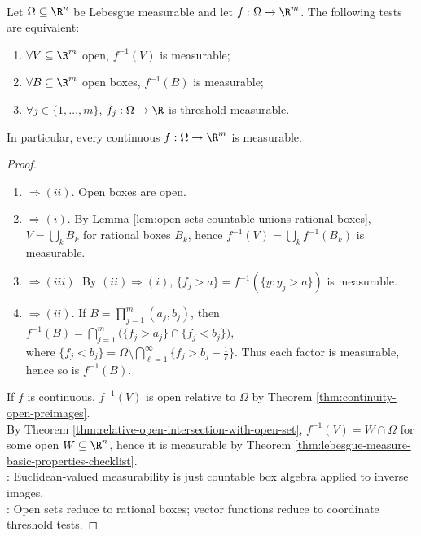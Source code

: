 \begin{proposition} \label{prop:measurable-function-open-set-test} \\
Let $\Omega\subseteq\R^n$ be Lebesgue measurable and let $f:\Omega\to\R^m$. The following tests are equivalent:
\begin{enumerate}[label=(\roman*)]
\setlength{\itemsep}{0pt}
\item $\forall V\subseteq\R^m$ open, $f^{-1}(V)$ is measurable;
\item $\forall B\subseteq\R^m$ open boxes, $f^{-1}(B)$ is measurable;
\item $\forall j\in\{1,\ldots,m\}$, $f_j:\Omega\to\R$ is threshold-measurable.
\end{enumerate}
In particular, every continuous $f:\Omega\to\R^m$ is measurable.
\begin{proof}
\begin{enumerate}[label=(\roman*).]
\setlength{\itemsep}{0pt}
\item[$(i)$]$\Rightarrow (ii)$. Open boxes are open.
\item[$(ii)$]$\Rightarrow (i)$. By Lemma \ref{lem:open-sets-countable-unions-rational-boxes}, $V=\bigcup\limits_kB_k$ for rational boxes $B_k$, hence $f^{-1}(V)=\bigcup\limits_kf^{-1}(B_k)$ is measurable.
\item[$(ii)$]$\Rightarrow (iii)$. By $(ii)\Rightarrow(i)$, $\{f_j>a\}=f^{-1}(\{y:y_j>a\})$ is measurable.
\item[$(iii)$]$\Rightarrow (ii)$. If $B=\prod\limits_{j=1}^{m}(a_j,b_j)$, then $f^{-1}(B)=\bigcap\limits_{j=1}^{m}\bigl(\{f_j>a_j\}\cap\{f_j<b_j\}\bigr)$,\\
where $\{f_j<b_j\}=\Omega\setminus\bigcap\limits_{\ell=1}^{\infty}\{f_j>b_j-\frac{1}{\ell}\}$. Thus each factor is measurable, hence so is $f^{-1}(B)$.
\end{enumerate}
If $f$ is continuous, $f^{-1}(V)$ is open relative to $\Omega$ by Theorem \ref{thm:continuity-open-preimages}.\\
By Theorem \ref{thm:relative-open-intersection-with-open-set}, $f^{-1}(V)=W\cap\Omega$ for some open $W\subseteq\R^n$, hence it is measurable by Theorem \ref{thm:lebesgue-measure-basic-properties-checklist}.\\
: Euclidean-valued measurability is just countable box algebra applied to inverse images.\\
: Open sets reduce to rational boxes; vector functions reduce to coordinate threshold tests.
\end{proof}
\end{proposition}


